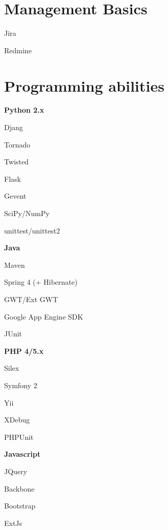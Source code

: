 \documentclass[10pt, a4paper, english]{article}
\begin{document}
\section* {Management Basics}
\begin {list}{\textbullet}{}
\item Jira
\item Redmine
\end{list}


\section* {Programming abilities}
\begin{multicols}{3}
\begin {list}{\textbullet}{}
\item \textbf{Python 2.x}
\begin {list}{\textbullet}{}
\item Djang
\item Tornado
\item Twisted
\item Flask
\item Gevent
\item SciPy/NumPy
\item unittest/unittest2
\end{list}
\item \textbf{Java}
\begin {list}{\textbullet}{}
\item Maven
\item Spring 4 (+ Hibernate)
\item GWT/Ext GWT
\item Google App Engine SDK
\item JUnit
\end{list}
\columnbreak
\item \textbf{PHP 4/5.x}
\begin {list}{\textbullet}{}
\item Silex
\item Symfony 2
\item Yii
\item XDebug
\item PHPUnit
\end{list}
\item \textbf{Javascript}
\begin {list}{\textbullet}{}
\item JQuery
\item Backbone
\item Bootstrap
\item ExtJs

\end{list}
\end{list}
\end{multicols}
\end{document}
